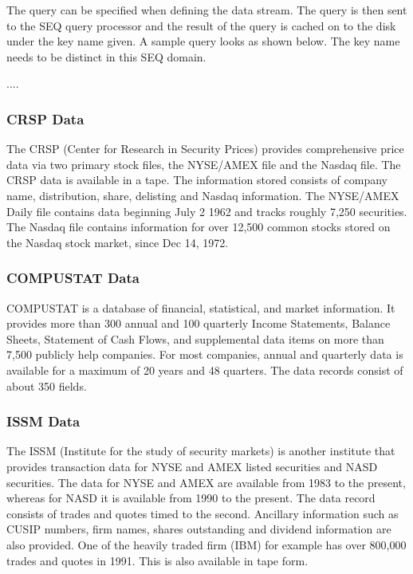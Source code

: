 The query can be specified when defining the data stream. The query is then sent to the SEQ query processor and the result of the query is cached on to the disk under the key name given. A sample query looks as shown below. The key name needs to be distinct in this SEQ domain.

....


\subsubsection{CRSP Data}

The CRSP (Center for Research in Security Prices) provides comprehensive price data via two primary stock files, the NYSE/AMEX file and the Nasdaq file. The CRSP data is available in a tape. The information stored consists of company name, distribution, share, delisting and Nasdaq information. The NYSE/AMEX Daily file contains data beginning July 2 1962 and tracks roughly 7,250 securities. The Nasdaq file contains information for over 12,500 common stocks stored on the Nasdaq stock market, since Dec 14, 1972.                       


\subsubsection{COMPUSTAT Data}

COMPUSTAT is a database of financial, statistical, and market information. It provides more than 300 annual and 100 quarterly Income Statements, Balance Sheets, Statement of Cash Flows, and supplemental data items on more than 7,500 publicly help companies. For most companies, annual and quarterly data is available for a maximum of 20 years and 48 quarters. The data records consist of about 350 fields. 


\subsubsection{ISSM Data}

The ISSM (Institute for the study of security markets) is another institute that provides transaction data for NYSE and AMEX listed securities and NASD securities. The data for NYSE and AMEX are available from 1983 to the present, whereas for  NASD it is available from 1990 to the present. The data record consists of trades and quotes timed to the second. Ancillary information such as CUSIP numbers, firm names, shares outstanding and dividend information are also provided. One of the heavily traded firm (IBM) for example has over 800,000 trades and quotes in 1991. This is also available in tape form. 

